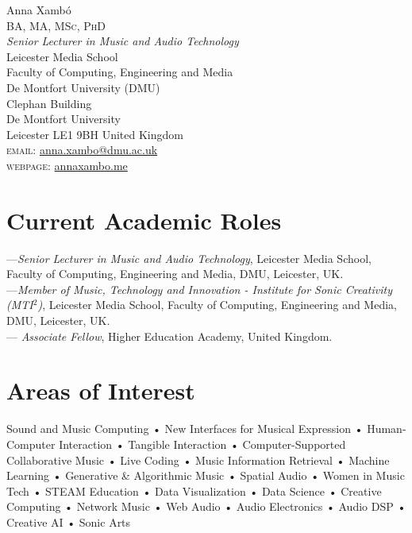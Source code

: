 \documentclass[10pt, a4paper]{article}
\begin{document}
{\Huge Anna Xambó}\\[0.1cm]
\textsc{BA, MA, MSc, PhD}\\[0.9cm]
\emph{Senior Lecturer in Music and Audio Technology}\\
Leicester Media School\\
Faculty of Computing, Engineering and Media\\
De Montfort University (DMU)\\
Clephan Building \\
De Montfort University\\
Leicester LE1 9BH United Kingdom\\[.2cm]
\textsc{email}: \href{mailto:anna.xambo@dmu.ac.uk}{anna.xambo@dmu.ac.uk}\\
\textsc{webpage}: \href{http://annaxambo.me/}{annaxambo.me}

\section*{Current Academic Roles}
---\emph{Senior Lecturer in Music and Audio Technology}, Leicester Media School, Faculty of Computing, Engineering and Media, DMU, Leicester, UK.\\
---\emph{Member of Music, Technology and Innovation - Institute for Sonic Creativity (MTI${^2}$)}, Leicester Media School, Faculty of Computing, Engineering and Media, DMU, Leicester, UK.\\
---\emph{ Associate Fellow}, Higher Education Academy, United Kingdom.
\section*{Areas of Interest}
Sound and Music Computing • New Interfaces for Musical Expression • Human-Computer Interaction • Tangible Interaction • Computer-Supported Collaborative Music • Live Coding • Music Information Retrieval • Machine Learning • Generative \& Algorithmic Music • Spatial Audio • Women in Music Tech • STEAM Education • Data Visualization • Data Science • Creative Computing • Network Music • Web Audio • Audio Electronics • Audio DSP • Creative AI • Sonic Arts
\end{document}
